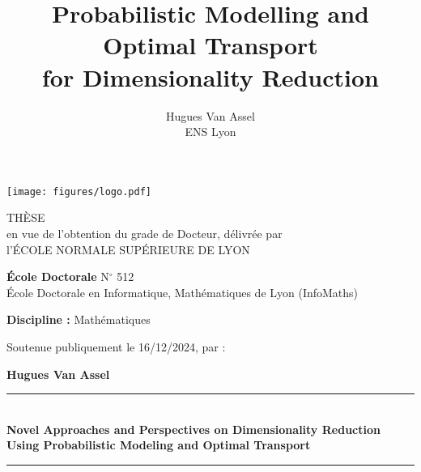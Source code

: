 \documentclass[openany]{now} %
\title{Probabilistic Modelling and Optimal Transport \\
for Dimensionality Reduction}
\author{
    Hugues Van Assel \\ ENS Lyon
}}
\begin{document}
\newcommand{\red}[1]{{\color{cadmiumred}#1}}
\newcommand{\green}[1]{{\color{cadmiumgreen}#1}}

\newcommand{\todo}[1]{\textcolor{red}{\textbf{TODO:} #1}}



\dominitoc


\begin{titlepage}
	
	\begin{center}
		\texttt{[image: figures/logo.pdf]}
		
		\vspace{30pt}
		
		{\Large {TH\`ESE \\ \vspace{1pt} en vue de l'obtention du grade de Docteur, délivrée par \\ \vspace{8pt} l'\'ECOLE NORMALE SUP\'ERIEURE DE LYON}}
		
		\vspace{30pt}
		
		{\large \textbf{\'Ecole Doctorale} N$^\circ $ 512}\\
		{\large{École Doctorale en Informatique, Mathématiques de Lyon (InfoMaths)}}
		
		\vspace{28pt}
		
		{\large\textbf{Discipline :} Mathématiques}
		
		\vspace{20pt}
		
		Soutenue publiquement le 16/12/2024, par :\\
		
		\vspace{12pt}
		
		{\Large\textbf{Hugues Van Assel}}\\
	\end{center}
	
	\vspace{12pt}
	
	\begin{center}
		\noindent\rule{16cm}{0.25pt}\\
		\vspace{10pt}
		{\LARGE \textbf{Novel Approaches and Perspectives on Dimensionality Reduction Using Probabilistic Modeling and Optimal Transport}} \\
		\noindent\rule{16cm}{0.25pt}\\
	\end{center}
	

\end{titlepage}
\end{document}
